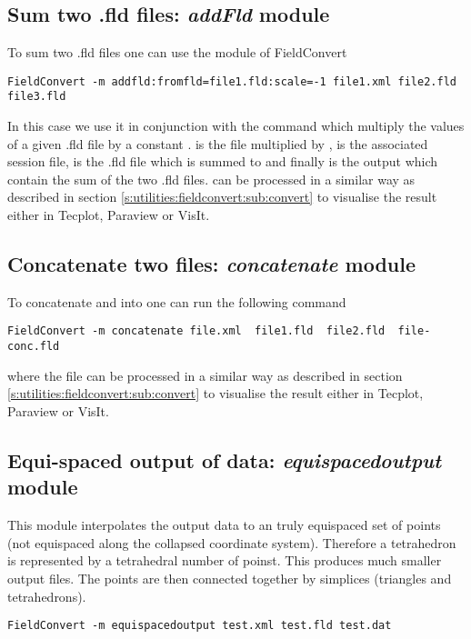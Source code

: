 \subsection{Sum two .fld files: \textit{addFld} module}
To sum two .fld files one can use the  module of FieldConvert
%
\begin{lstlisting}[style=BashInputStyle]
FieldConvert -m addfld:fromfld=file1.fld:scale=-1 file1.xml file2.fld file3.fld
\end{lstlisting}
%
In this case we use it in conjunction with the command  
which multiply the values of a given .fld file by a constant . 
 is the file multiplied by ,  
is the associated session file,  is the .fld file which 
is summed to  and finally  is the output 
which contain the sum of the two .fld files.
 can be processed in a similar way as described 
in section \ref{s:utilities:fieldconvert:sub:convert} to visualise 
the result either in Tecplot, Paraview or VisIt.
%
%
%
\subsection{Concatenate two files: \textit{concatenate} module}
To concatenate  and  into 
one can run the following command
%
\begin{lstlisting}[style=BashInputStyle]
FieldConvert -m concatenate file.xml  file1.fld  file2.fld  file-conc.fld
\end{lstlisting}
%
where the file  can be processed in a similar 
way as described in section \ref{s:utilities:fieldconvert:sub:convert}
to visualise the result either in Tecplot, Paraview or VisIt.
%
%
%
\subsection{Equi-spaced output of data: \textit{equispacedoutput} module}
This module interpolates the output data to an truly equispaced set of
points (not equispaced along the collapsed coordinate
system). Therefore a tetrahedron is represented by a tetrahedral
number of poinst. This produces much smaller output files. The points
are then connected together by simplices (triangles and tetrahedrons).

\begin{lstlisting}[style=BashInputStyle]
FieldConvert -m equispacedoutput test.xml test.fld test.dat
\end{lstlisting}

